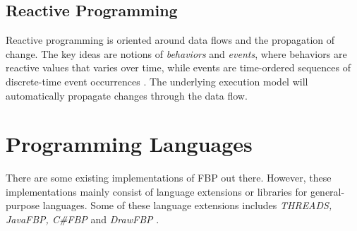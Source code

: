 \subsection{Reactive Programming}
Reactive programming is oriented around data flows and the propagation
of change. The key ideas are notions of \emph{behaviors} and
\emph{events}, where behaviors are reactive values that varies over
time, while events are time-ordered sequences of discrete-time event
occurrences \citep{wan:2000}. The underlying execution model will
automatically propagate changes through the data flow.


\section{Programming Languages}
There are some existing implementations of FBP out there. However,
these implementations mainly consist of language extensions or
libraries for general-purpose languages. Some of these language
extensions includes \emph{THREADS, JavaFBP, C\#FBP} and
\emph{DrawFBP} \citep{morrison:2010}.



